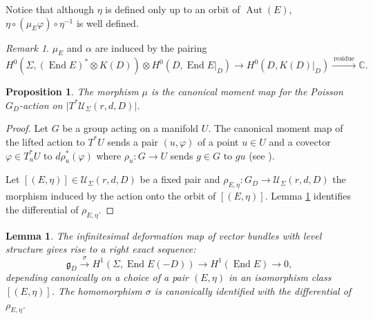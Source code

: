 \documentclass[12pt,a4paper,oneside,english]{smfart}
\newtheorem{prop}[thm]{Proposition}
\newtheorem{lem}[thm]{Lemma}
\theoremstyle{definition}
\theoremstyle{remark}
\newtheorem{rem}[thm]{Remark}
\DeclareMathOperator{\End}{End}
\DeclareMathOperator{\Aut}{Aut}
\newcommand{\cU}{\mathcal{U}}
\newcommand{\tot}[1]{\lvert #1 \rvert}
\begin{document}
Notice that although $\eta$ is defined only up to an orbit of $\Aut(E)$, $\eta \circ (\mu_E \varphi) \circ \eta^{-1}$ is well defined.

\begin{rem}\label{t6.11}
$\mu_E$ and $\alpha$ are induced by the pairing
\[
H^0(\Sigma, (\End E)^* \otimes K(D)) \otimes H^0(D, \End E|_D) \to H^0(D, K(D)|_D) \xrightarrow{\ \text{residue}\ } \mathbb{C}.
\]
\end{rem}

\begin{prop}\label{t6.12}
The morphism $\mu$ is the canonical moment map for the Poisson $G_D$-action on $\tot{T^*\cU_\Sigma(r, d, D)}$.
\end{prop}

\begin{proof}
Let $G$ be a group acting on a manifold $U$. The canonical moment map of the lifted action to $T^*U$ sends a pair $(u, \varphi)$ of a point $u \in U$ and a covector $\varphi \in T_u^*U$ to $d\rho_u^*(\varphi)$ where $\rho_u \colon G \to U$ sends $g \in G$ to $gu$ (see \cite{A-G}).

Let $[(E, \eta)] \in \cU_\Sigma(r, d, D)$ be a fixed pair and $\rho_{E, \eta} \colon G_D \to \cU_\Sigma(r, d, D)$ the morphism induced by the action onto the orbit of $[(E, \eta)]$. Lemma \ref{t6.13} identifies the differential of $\rho_{E, \eta}$.
\end{proof}

\begin{lem}\label{t6.13}
The infinitesimal deformation map of vector bundles with level structure gives rise to a right exact sequence:
\[
\mathfrak{g}_D \xrightarrow{\ \sigma\ } H^1(\Sigma, \End E(-D)) \to H^1(\End E) \to 0,
\]
depending canonically on a choice of a pair $(E, \eta)$ in an isomorphism class $[(E, \eta)]$. The homomorphism $\sigma$ is canonically identified with the differential of $\rho_{E, \eta}$.
\end{lem}
\end{document}
